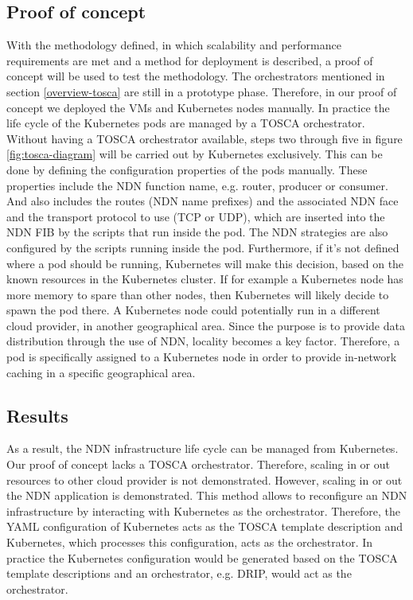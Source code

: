 \subsection{Proof of concept}
\label{planning-poc}
With the methodology defined, in which scalability and performance requirements are met and a method for deployment is described, a proof of concept will be used to test the methodology. The orchestrators mentioned in section \ref{overview-tosca} are still in a prototype phase. Therefore, in our proof of concept we deployed the VMs and Kubernetes nodes manually. In practice the life cycle of the Kubernetes pods are managed by a TOSCA orchestrator. Without having a TOSCA orchestrator available, steps two through five in figure \ref{fig:tosca-diagram} will be carried out by Kubernetes exclusively. This can be done by defining the configuration properties of the pods manually. These properties include the NDN function name, e.g. router, producer or consumer. And also includes the routes (NDN name prefixes) and the associated NDN face and the transport protocol to use (TCP or UDP), which are inserted into the NDN FIB by the scripts that run inside the pod. The NDN strategies are also configured by the scripts running inside the pod. Furthermore, if it's not defined where a pod should be running, Kubernetes will make this decision, based on the known resources in the Kubernetes cluster. If for example a Kubernetes node has more memory to spare than other nodes, then Kubernetes will likely decide to spawn the pod there. A Kubernetes node could potentially run in a different cloud provider, in another geographical area. Since the purpose is to provide data distribution through the use of NDN, locality becomes a key factor. Therefore, a pod is specifically assigned to a Kubernetes node in order to provide in-network caching in a specific geographical area.


\subsection{Results}
As a result, the NDN infrastructure life cycle can be managed from Kubernetes. Our proof of concept lacks a TOSCA orchestrator. Therefore, scaling in or out resources to other cloud provider is not demonstrated. However, scaling in or out the NDN application is demonstrated. This method allows to reconfigure an NDN infrastructure by interacting with Kubernetes as the orchestrator. Therefore, the YAML configuration of Kubernetes acts as the TOSCA template description and Kubernetes, which processes this configuration, acts as the orchestrator. In practice the Kubernetes configuration would be generated based on the TOSCA template descriptions and an orchestrator, e.g. DRIP, would act as the orchestrator.

